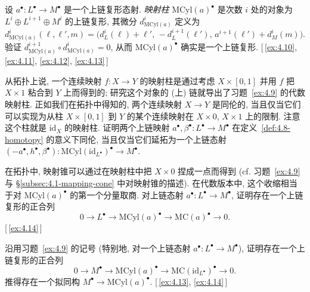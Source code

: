 \begin{prob}\label{ex:4.9}
设 $a^\bullet:L^\bullet\to M^\bullet$ 是一个上链复形态射. \emph{映射柱} $\mathrm{MCyl}(a)^\bullet$ 是次数 $i$ 处的对象为 $L^i\oplus L^{i+1}\oplus M^i$ 的上链复形, 其微分 $d_{\mathrm{MCyl}(a)}^i$ 定义为
\[
d_{\mathrm{MCyl}(a)}^i(\ell,\ell',m)=\bigl(d_L^i(\ell)+\ell',\,-d_L^{i+1}(\ell'),\, a^{i+1}(\ell')+d_M^i(m)\bigr).
\]
验证 $d_{\mathrm{MCyl}(a)}^{i+1}\circ d_{\mathrm{MCyl}(a)}^i=0$, 从而 $\mathrm{MCyl}(a)^\bullet$ 确实是一个上链复形. [\,\ref{ex:4.10}, \ref{ex:4.11}, \ref{ex:4.12}, \ref{ex:4.13}\,]
\end{prob}

\begin{prob}\label{ex:4.10}
从拓扑上说, 一个连续映射 $f:X\to Y$ 的映射柱是通过考虑 $X\times[0,1]$ 并用 $f$ 把 $X\times1$ 粘合到 $Y$ 上而得到的; 研究这个对象的 (上) 链就导出了习题~\ref{ex:4.9} 的代数映射柱.
正如我们在拓扑中得知的, 两个连续映射 $X\to Y$ 是同伦的, 当且仅当它们可以实现为从柱 $X\times[0,1]$ 到 $Y$ 的某个连续映射在 $X\times0$, $X\times1$ 上的限制. 注意这个柱就是 $\mathrm{id}_X$ 的映射柱.
证明两个上链映射 $a^\bullet,\beta^\bullet:L^\bullet\to M^\bullet$ 在定义~\ref{def:4.8-homotopy} 的意义下同伦, 当且仅当它们延拓为一个上链态射 $(-a^\bullet,h^\bullet,\beta^\bullet):\mathrm{MCyl}(\mathrm{id}_{L^\bullet})^\bullet\to M^\bullet$.
\end{prob}

\begin{prob}\label{ex:4.11}
在拓扑中, 映射锥可以通过在映射柱中把 $X\times0$ 捏成一点而得到 (cf. 习题~\ref{ex:4.9} 与 \S\ref{subsec:4.1-mapping-cone} 中对映射锥的描述).
在代数版本中, 这个收缩相当于对 $\mathrm{MCyl}(a)^\bullet$ 的第一个分量取商. 对上链态射 $a^\bullet:L^\bullet\to M^\bullet$, 证明存在一个上链复形的正合列
\[
0\longrightarrow L^\bullet\longrightarrow\mathrm{MCyl}(a)^\bullet\longrightarrow\mathrm{MC}(a)^\bullet\longrightarrow 0.
\]
[\,\ref{ex:4.14}\,]
\end{prob}

\begin{prob}\label{ex:4.12}
沿用习题~\ref{ex:4.9} 的记号 (特别地, 对一个上链态射 $a^\bullet:L^\bullet\to M^\bullet$), 证明存在一个上链复形的正合列
\[
0\longrightarrow M^\bullet\longrightarrow\mathrm{MCyl}(a)^\bullet\longrightarrow\mathrm{MC}(\mathrm{id}_{L^\bullet})^\bullet\longrightarrow 0.
\]
推得存在一个拟同构 $M^\bullet\to\mathrm{MCyl}(a)^\bullet$. [\,\ref{ex:4.13}, \ref{ex:4.14}\,]
\end{prob}

